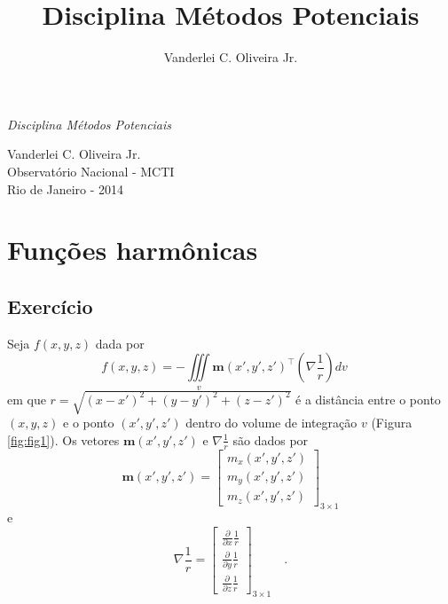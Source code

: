 \documentclass[10pt,a4paper,fleqn]{article}
\title{Disciplina M\'{e}todos Potenciais}
\author{Vanderlei C. Oliveira Jr.}
\date{}
\begin{document}
\begin{flushleft}
\begin{huge}
\emph{Disciplina M\'{e}todos Potenciais}
\end{huge}
\end{flushleft}
\begin{flushleft}
Vanderlei C. Oliveira Jr. \\
Observat\'{o}rio Nacional - MCTI \\
Rio de Janeiro - 2014
\end{flushleft}

\hrulefill

\tableofcontents

\hrulefill

\section{Funç\~{o}es harm\^{o}nicas}

\subsection{Exerc\'{i}cio}

Seja $f(x,y,z)$ dada por
\begin{equation}
f(x,y,z) = - \iiint \limits_{v} \mathbf{m}(x',y',z')^{\intercal}
                                \left( \nabla \frac{1}{r} \right)
                                 d v \quad
\label{eq:ex11-func-f}
\end{equation}
em que $r = \sqrt{(x-x')^{2}+(y-y')^{2}+(z-z')^{2}}$ \'{e} a dist\^{a}ncia entre o ponto $(x,y,z)$
e o ponto $(x',y',z')$ dentro do volume de integraç\~{a}o $v$ (Figura \ref{fig:fig1}). Os vetores
$\mathbf{m}(x',y',z')$ e $\nabla \frac{1}{r}$ s\~{a}o dados por
\begin{equation}
\mathbf{m}(x',y',z') =
\left[
\begin{array}{c}
m_{x}(x',y',z') \\
m_{y}(x',y',z') \\
m_{z}(x',y',z')
\end{array}
\right]_{3 \times 1}
\label{eq:ex11-mag-vec}
\end{equation}
e
\begin{equation}
\nabla \frac{1}{r} =
\left[
\begin{array}{c}
\frac{\partial}{\partial x} \frac{1}{r} \\
\frac{\partial}{\partial y} \frac{1}{r} \\
\frac{\partial}{\partial z} \frac{1}{r}
\end{array}
\right]_{3 \times 1} \quad .
\label{eq:ex11-grad-invr}
\end{equation}
\end{document}
